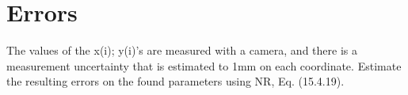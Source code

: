 \section{Errors}
The values of the x(i); y(i)'s are measured with a camera, and there is a
measurement uncertainty that is estimated to 1mm on each coordinate.
Estimate the resulting errors on the found parameters using NR, Eq.
(15.4.19).